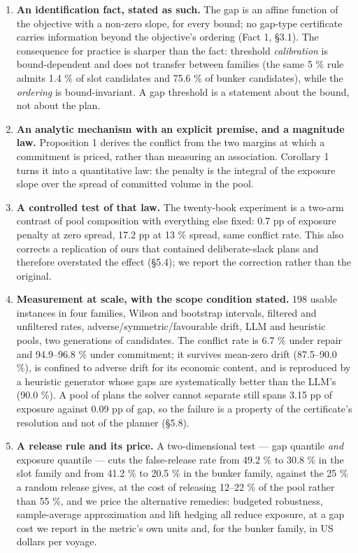 \documentclass[preprint,12pt,letterpaper]{elsarticle}
\theoremstyle{definition}
\theoremstyle{plain}
\begin{document}
\begin{enumerate}
\item \textbf{An identification fact, stated as such.} The gap is an affine function of the objective with a non-zero slope, for every bound; no gap-type certificate carries information beyond the objective's ordering (Fact 1, \S 3.1). The consequence for practice is sharper than the fact: threshold \textit{calibration} is bound-dependent and does not transfer between families (the same 5 \% rule admits 1.4 \% of slot candidates and 75.6 \% of bunker candidates), while the \textit{ordering} is bound-invariant. A gap threshold is a statement about the bound, not about the plan.
\item \textbf{An analytic mechanism with an explicit premise, and a magnitude law.} Proposition 1 derives the conflict from the two margins at which a commitment is priced, rather than measuring an association. Corollary 1 turns it into a quantitative law: the penalty is the integral of the exposure slope over the spread of committed volume in the pool.
\item \textbf{A controlled test of that law.} The twenty-book experiment is a two-arm contrast of pool composition with everything else fixed: 0.7 pp of exposure penalty at zero spread, 17.2 pp at 13 \% spread, same conflict rate. This also corrects a replication of ours that contained deliberate-slack plans and therefore overstated the effect (\S 5.4); we report the correction rather than the original.
\item \textbf{Measurement at scale, with the scope condition stated.} 198 usable instances in four families, Wilson and bootstrap intervals, filtered and unfiltered rates, adverse/symmetric/favourable drift, LLM and heuristic pools, two generations of candidates. The conflict rate is 6.7 \% under repair and 94.9--96.8 \% under commitment; it survives mean-zero drift (87.5--90.0 \%), is confined to adverse drift for its economic content, and is reproduced by a heuristic generator whose gaps are systematically better than the LLM's (90.0 \%). A pool of plans the solver cannot separate still spans 3.15 pp of exposure against 0.09 pp of gap, so the failure is a property of the certificate's resolution and not of the planner (\S 5.8).
\item \textbf{A release rule and its price.} A two-dimensional test --- gap quantile \textit{and} exposure quantile --- cuts the false-release rate from 49.2 \% to 30.8 \% in the slot family and from 41.2 \% to 20.5 \% in the bunker family, against the 25 \% a random release gives, at the cost of releasing 12--22 \% of the pool rather than 55 \%, and we price the alternative remedies: budgeted robustness, sample-average approximation and lift hedging all reduce exposure, at a gap cost we report in the metric's own units and, for the bunker family, in US dollars per voyage.
\end{enumerate}
\end{document}
